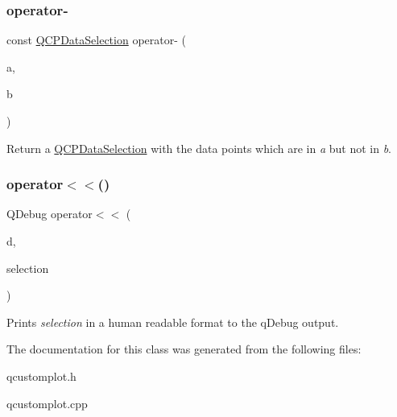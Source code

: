 \subsubsection{\texorpdfstring{operator-\/}{operator-}\hspace{0.1cm}{\footnotesize\ttfamily [4/4]}}
{\footnotesize\ttfamily const \hyperlink{classQCPDataSelection}{Q\+C\+P\+Data\+Selection} operator-\/ (\begin{DoxyParamCaption}\item[{const \hyperlink{classQCPDataRange}{Q\+C\+P\+Data\+Range} \&}]{a,  }\item[{const \hyperlink{classQCPDataRange}{Q\+C\+P\+Data\+Range} \&}]{b }\end{DoxyParamCaption})\hspace{0.3cm}{\ttfamily [friend]}}

Return a \hyperlink{classQCPDataSelection}{Q\+C\+P\+Data\+Selection} with the data points which are in {\itshape a} but not in {\itshape b}. \mbox{\label{classQCPDataSelection_aed65b8988afe6b03adeadf5edf663670}} 
\subsubsection{\texorpdfstring{operator$<$$<$()}{operator<<()}}
{\footnotesize\ttfamily Q\+Debug operator$<$$<$ (\begin{DoxyParamCaption}\item[{Q\+Debug}]{d,  }\item[{const \hyperlink{classQCPDataSelection}{Q\+C\+P\+Data\+Selection} \&}]{selection }\end{DoxyParamCaption})\hspace{0.3cm}{\ttfamily [related]}}

Prints {\itshape selection} in a human readable format to the q\+Debug output. 

The documentation for this class was generated from the following files\+:\begin{DoxyCompactItemize}
\item 
qcustomplot.\+h\item 
qcustomplot.\+cpp\end{DoxyCompactItemize}
